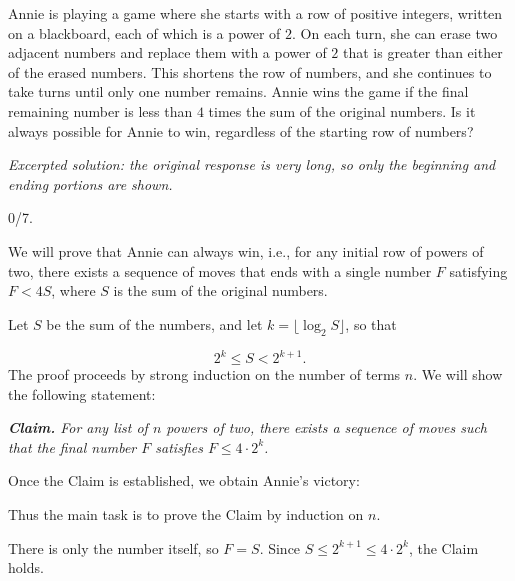 \begin{mdframed}[style=mdpurplebox,frametitle={USAMO 2026 Problem 2}]
Annie is playing a game where she starts with a row of positive integers, written on a blackboard, each of which is a power of $2$. On each turn, she can erase two adjacent numbers and replace them with a power of $2$ that is greater than either of the erased numbers. This shortens the row of numbers, and she continues to take turns until only one number remains. Annie wins the game if the final remaining number is less than $4$ times the sum of the original numbers. Is it always possible for Annie to win, regardless of the starting row of numbers?
\end{mdframed}
\par\noindent\textit{Excerpted solution: the original response is very long, so only the beginning and ending portions are shown.}\par
{}
\begin{remark*}
  0/7.
\end{remark*}
We will prove that Annie can always win, i.e., for any initial row of powers of two, there exists a sequence of moves that ends with a single number \(F\) satisfying \(F < 4S\), where \(S\) is the sum of the original numbers.\par
Let \(S\) be the sum of the numbers, and let \(k = \lfloor \log_2 S \rfloor\), so that\par
\[
2^k \le S < 2^{k+1}.
\]
The proof proceeds by strong induction on the number of terms \(n\). We will show the following statement:\par
\par\noindent\emph{\textbf{Claim.}  For any list of \(n\) powers of two, there exists a sequence of moves such that the final number \(F\) satisfies \(F \le 4 \cdot 2^{k}\).}\par
Once the Claim is established, we obtain Annie's victory:\par
{}
Thus the main task is to prove the Claim by induction on \(n\).\par
\smallskip
{}
There is only the number itself, so \(F = S\). Since \(S \le 2^{k+1} \le 4 \cdot 2^{k}\), the Claim holds.\par
